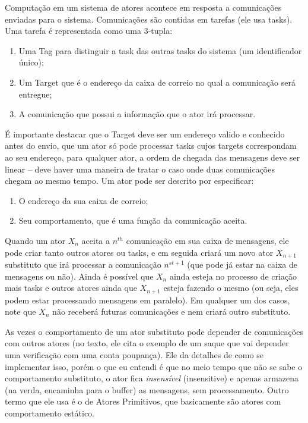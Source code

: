 \documentclass[]{article}
\begin{document}
		\par Computação em um sistema de atores acontece em resposta a comunicações enviadas para o sistema. Comunicações
		são contidas em tarefas (ele usa tasks). Uma tarefa é representada como uma 3-tupla:
		\begin{enumerate}
			\item Uma Tag para distinguir a task das outras tasks do sistema (um identificador único);
			\item Um Target que é o endereço da caixa de correio no qual a comunicação será entregue;
			\item A comunicação que possui a informação que o ator irá processar.			
		\end{enumerate}		

		\par É importante destacar que o Target deve ser um endereço valido e conhecido antes do envio, que um ator só
		pode processar tasks cujos targets correspondam ao seu endereço, para qualquer ator, a ordem de chegada das
		mensagens deve ser linear -- deve haver uma maneira de tratar o caso onde duas comunicações chegam ao mesmo
		tempo. Um ator pode ser descrito por especificar:
		\begin{enumerate}
			\item O endereço da sua caixa de correio;
			\item Seu comportamento, que é uma função da comunicação aceita.
		\end{enumerate}
		
		\par Quando um ator $X_n$ aceita a $n^{th}$ comunicação em sua caixa de mensagens, ele pode criar tanto outros
		atores ou tasks, e em seguida criará um novo ator $X_{n+1}$ substituto que irá processar a comunicação
		$n^{st+1}$ (que pode já estar na caixa de mensagens ou não). Ainda é possível  que $X_n$ ainda esteja no
		processo de criação mais tasks e outros atores ainda que $X_{n+1}$ esteja fazendo o mesmo (ou seja, eles podem
		estar processando mensagens em paralelo). Em qualquer um dos casos, note que $X_n$ não receberá futuras 
		comunicações e nem criará outro substituto.
		
		\par As vezes o comportamento de um ator substituto pode depender de comunicações com outros atores (no texto,
		ele cita o exemplo de um saque que vai depender uma verificação com uma conta poupança). Ele da detalhes
		de como se implementar isso, porém o que eu entendi é que no meio tempo que não se sabe o comportamento
		substituto, o ator fica \emph{insensível} (insensitive) e apenas armazena (na verda, encaminha para o buffer)
		as mensagens, sem processamento. Outro termo que ele usa é o de Atores Primitivos, que basicamente são atores
		com comportamento estático.
\end{document}
